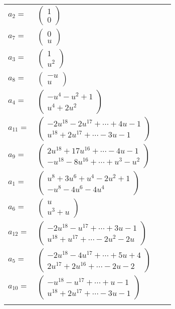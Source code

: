 \documentclass[1p]{elsarticle_modified}
\theoremstyle{definition}
\begin{document}
\begin{tabular}{m{7pt} m{180pt} m{7pt} m{180pt} }
\flushright $a_{2}=$&$\begin{pmatrix}1\\0\end{pmatrix}$ \\
\flushright $a_{7}=$&$\begin{pmatrix}0\\u\end{pmatrix}$ \\
\flushright $a_{3}=$&$\begin{pmatrix}1\\u^2\end{pmatrix}$ \\
\flushright $a_{8}=$&$\begin{pmatrix}- u\\u\end{pmatrix}$ \\
\flushright $a_{4}=$&$\begin{pmatrix}- u^4- u^2+1\\u^4+2 u^2\end{pmatrix}$ \\
\flushright $a_{11}=$&$\begin{pmatrix}-2 u^{18}-2 u^{17}+\cdots+4 u-1\\u^{18}+2 u^{17}+\cdots-3 u-1\end{pmatrix}$ \\
\flushright $a_{9}=$&$\begin{pmatrix}2 u^{18}+17 u^{16}+\cdots-4 u-1\\- u^{18}-8 u^{16}+\cdots+u^3- u^2\end{pmatrix}$ \\
\flushright $a_{1}=$&$\begin{pmatrix}u^8+3 u^6+u^4-2 u^2+1\\- u^8-4 u^6-4 u^4\end{pmatrix}$ \\
\flushright $a_{6}=$&$\begin{pmatrix}u\\u^3+u\end{pmatrix}$ \\
\flushright $a_{12}=$&$\begin{pmatrix}-2 u^{18}- u^{17}+\cdots+3 u-1\\u^{18}+u^{17}+\cdots-2 u^2-2 u\end{pmatrix}$ \\
\flushright $a_{5}=$&$\begin{pmatrix}-2 u^{18}-4 u^{17}+\cdots+5 u+4\\2 u^{17}+2 u^{16}+\cdots-2 u-2\end{pmatrix}$ \\
\flushright $a_{10}=$&$\begin{pmatrix}- u^{18}- u^{17}+\cdots+u-1\\u^{18}+2 u^{17}+\cdots-3 u-1\end{pmatrix}$\\&\end{tabular}
\end{document}
